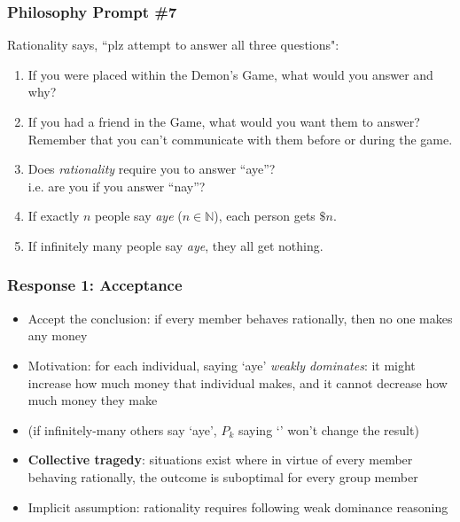 \begin{frame}
\frametitle{Philosophy Prompt \#7}
Rationality says, ``plz attempt to answer all three questions":
\begin{enumerate}[<+->]

\item If you were placed within the Demon's Game, what would you answer and why?

\item If you had a friend in the Game, what would you want them to answer? Remember that you can't communicate with them before or during the game. 

\item Does \emph{rationality} require you to answer ``aye''? \\ i.e. are you  if you answer ``nay''? 

\medskip

\item[] {\small If exactly $n$ people say \emph{aye} ($n \in \mathbb{N}$), each person gets $\$n$.} 

\item[] {\small If infinitely many people say \emph{aye}, they all get nothing.}

\end{enumerate}
\end{frame}

\begin{frame}
\frametitle{Response 1: Acceptance}

\begin{itemize}[<+->]

\item Accept the conclusion: if every member behaves rationally, then no one makes any money

\item Motivation: for each individual, saying `aye'  \emph{weakly dominates}: it might increase how much money that individual makes, and it cannot decrease how much money they make 

\item[] (if infinitely-many others say `aye', $P_k$ saying `' won't change the result)

\item \textbf{Collective tragedy}: situations exist where in virtue of every member behaving rationally, the outcome is suboptimal for every group member

\item Implicit assumption: rationality requires following weak dominance reasoning 

\end{itemize}
\end{frame}

